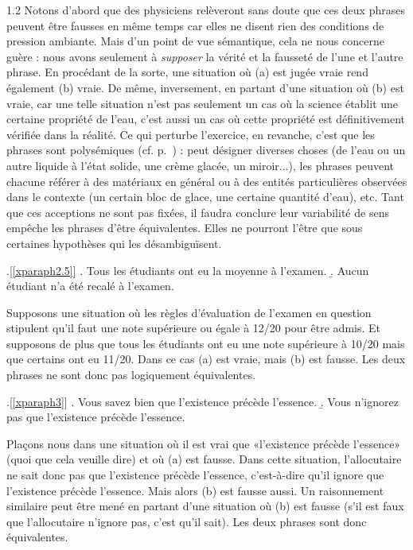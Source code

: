 \begin{Solution}{1.{2}}
Notons d'abord que des physiciens relèveront sans doute que ces deux phrases peuvent être fausses en même temps car elles ne disent rien des conditions de pression ambiante.  Mais d'un point de vue sémantique, cela ne nous concerne guère : nous avons seulement à \emph{supposer} la vérité et la fausseté de l'une et l'autre phrase.  En procédant de la sorte, une situation où (a) est jugée vraie rend également (b) vraie.  De même, inversement, en partant d'une situation où (b) est vraie, car une telle situation n'est pas seulement un cas où la science établit une certaine propriété de l'eau, c'est aussi un cas où cette propriété est définitivement vérifiée dans la réalité.  Ce qui perturbe l'exercice, en revanche, c'est que les phrases sont polysémiques (cf. p.~\pageref{p.polysem}) :  peut désigner diverses choses (de l'eau ou un autre liquide à l'état solide, une crème glacée, un miroir...), les phrases peuvent chacune référer à des matériaux en général ou à des entités particulières observées dans le contexte (un certain bloc de glace, une certaine quantité d'eau), etc. Tant que ces acceptions ne sont pas fixées, il faudra conclure leur variabilité de sens empêche les phrases d'être équivalentes.  Elles ne pourront l'être que sous certaines hypothèses qui les désambiguïsent.


\ex.[\ref{xparaph2.5}]
\a. Tous les étudiants ont eu la moyenne à l'examen.
\b. Aucun étudiant n'a été recalé à l'examen.

Supposons une situation où les règles d'évaluation de l'examen en question stipulent qu'il faut une note supérieure ou égale à 12/20 pour être admis. Et supposons de plus que tous les étudiants ont eu une note supérieure à 10/20 mais que certains ont eu 11/20.  Dans ce cas (a) est vraie, mais (b) est fausse. Les deux phrases ne sont donc pas logiquement équivalentes.


\ex.[\ref{xparaph3}]
\a. Vous savez bien que l'existence précède l'essence.
\b. Vous n'ignorez pas que l'existence précède l'essence.

Plaçons nous dans une situation où il est vrai que «l'existence précède l'essence» (quoi que cela veuille dire) et où (a) est fausse. Dans cette situation, l'allocutaire ne sait donc pas que l'existence précède l'essence, c'est-à-dire qu'il ignore que l'existence précède l'essence.  Mais alors (b) est fausse aussi. Un raisonnement similaire peut être mené en partant d'une situation où (b) est fausse (s'il est faux que l'allocutaire n'ignore pas, c'est qu'il sait).  Les deux phrases sont donc équivalentes.

\end{Solution}
